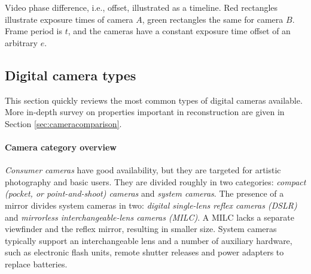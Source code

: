 %
%
%
%


{Video phase difference, i.e., offset, illustrated as a timeline.
Red rectangles illustrate exposure times of camera $A$, green rectangles the same for camera $B$.
Frame period is $t$, and the cameras have a constant exposure time offset of an arbitrary $e$.}


\subsection{Digital camera types} \label{sec:cameratypes} %


This section quickly reviews the most common types of digital cameras available.
More in-depth survey on properties important in reconstruction are given in Section \ref{sec:cameracomparison}.
%

\paragraph{Camera category overview}
\emph{Consumer cameras} have good availability, but they are targeted for artistic photography and basic users.
They are divided roughly in two categories: \emph{compact (pocket, or point-and-shoot) cameras} and \emph{system cameras}.
The presence of a mirror divides system cameras in two: \emph{digital single-lens reflex cameras (DSLR)} and \emph{mirrorless interchangeable-lens cameras (MILC)}.
A MILC lacks a separate viewfinder and the reflex mirror, resulting in smaller size.
System cameras typically support an interchangeable lens and a number of auxiliary hardware, such as electronic flash units, remote shutter releases and power adapters to replace batteries.


